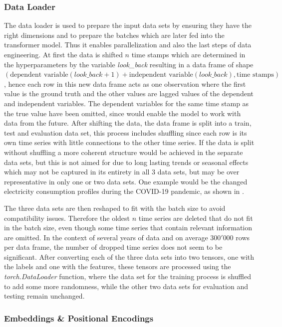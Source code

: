 \documentclass{article}
\begin{document}
\subsubsection{Data Loader}

The data loader is used to prepare the input data sets by ensuring they have the right dimensions and to prepare the batches which are later fed into the transformer model. Thus it enables parallelization and also the last steps of data engineering. At first the data is shifted $n$ time stamps which are determined in the hyperparameters by the variable \textit{look\_back} resulting in a data frame of shape $(\text{dependent variable}(look\_back + 1) + \text{independent variable}(look\_back), \text{time stamps})$, hence each row in this new data frame acts as one observation where the first value is the ground truth and the other values are lagged values of the dependent and independent variables. The dependent variables for the same time stamp as the true value have been omitted, since would enable the model to work with data from the future. After shifting the data, the data frame is split into a train, test and evaluation data set, this process includes shuffling since each row is its own time series with little connections to the other time series. If the data is split without shuffling a more coherent structure would be achieved in the separate data sets, but this is not aimed for due to long lasting trends or seasonal effects which may not be captured in its entirety in all 3 data sets, but may be over representative in only one or two data sets. One example would be the changed electricity consumption profiles during the COVID-19 pandemic, as shown in \cite{COVID_electric_consumption}.\par 
The three data sets are then reshaped to fit with the batch size to avoid compatibility issues. Therefore the oldest $n$ time series are deleted that do not fit in the batch size, even though some time series that contain relevant information are omitted. In the context of several years of data and on average $300'000$ rows per data frame, the number of dropped time series does not seem to be significant. After converting each of the three data sets into two tensors, one with the labels and one with the features, these tensors are processed using the \textit{torch.DataLoader} function, where the data set for the training process is shuffled to add some more randomness, while the other two data sets for evaluation and testing remain unchanged. 

\subsubsection{Embeddings \& Positional Encodings}
\end{document}
